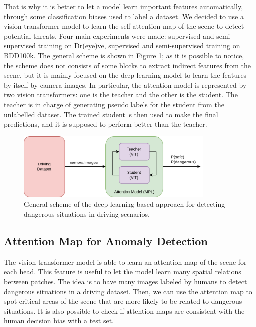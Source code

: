 That is why it is better to let a model learn important features automatically, through 
some classification biases used to label a dataset. We decided to use a vision 
transformer model to learn the self-attention map of the scene to detect 
potential threats.
Four main experiments were made: supervised and semi-supervised training on Dr(eye)ve, 
supervised and semi-supervised training on BDD100k.
The general scheme is shown in Figure \ref{fig:dl_approach_scheme}; as it is 
possible to notice, the scheme does not consists of some blocks to extract 
indirect features from the scene, but it is mainly focused on the deep learning 
model to learn the features by itself by camera images. In particular, the 
attention model is represented by two vision transformers: one is the teacher and 
the other is the student. The teacher is in charge of generating pseudo labels 
for the student from the unlabelled dataset. The trained student is then used 
to make the final predictions, and it is supposed to perform better than the
teacher.
\begin{figure}
\centering
\includegraphics[width=0.85\textwidth]{images/ssl/dl_approach_scheme.png}
\vspace{0.4cm}
\caption{General scheme of the deep learning-based approach for detecting
dangerous situations in driving scenarios.}
\label{fig:dl_approach_scheme}
\end{figure}

\subsection{Attention Map for Anomaly Detection}
The vision transformer model is able to learn an attention map of the scene for 
each head. This feature is useful to let the model learn many spatial relations 
between patches. The idea is to have many images labeled by humans to detect 
dangerous situations in a driving dataset. Then, we can use the attention map 
to spot critical areas of the scene that are more likely to be related to 
dangerous situations.
It is also possible to check if attention maps are consistent with the human 
decision bias with a test set.

